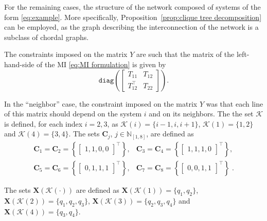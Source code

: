 \documentclass[10pt,twocolumn,twoside]{IEEEtran}
\theoremstyle{plain}
\theoremstyle{definition}
\theoremstyle{remark}
\begin{document}
For the remaining cases, the structure of the network composed of systems of the form \eqref{eq:example}. More specifically, Proposition~\ref{prop:clique tree decomposition} can be employed, as the graph describing the interconnection of the network is a subclass of chordal graphs. 

The constraints imposed on the matrix $Y$ are such that the matrix of the left-hand-side of the MI \eqref{eq:MI formulation} is given by
\begin{equation*}
	\mathbin{\mathtt{diag}}\left(\begin{bmatrix}
		T_{11}&T_{12}\\
		T_{12}^\top&T_{22}
	\end{bmatrix}\right).
\end{equation*}

In the ``neighbor'' case, the constraint imposed on the matrix $Y$ was that each line of this matrix should depend on the system $i$ and on its neighbors. The the set $\mathscr{K}$ is defined, for each index $i=2,3$, as $\mathscr{K}(i)=\{i-1,i,i+1\}$, $\mathscr{K}(1)=\{1,2\}$ and $\mathscr{K}(4)=\{3,4\}$. The sets $\mathbf{C}_j$, $j\in\mathbb{N}_{[1,8]}$, are defined as
\begin{equation*}
	\begin{array}{rl}
		\mathbf{C}_1=\mathbf{C}_2=\left\{\begin{bmatrix}1, 1, 0, 0\end{bmatrix}^\top\right\},&\mathbf{C}_3=\mathbf{C}_4=\left\{\begin{bmatrix}1, 1, 1, 0\end{bmatrix}^\top\right\},\\
		\mathbf{C}_5=\mathbf{C}_6=\left\{\begin{bmatrix}0, 1, 1, 1\end{bmatrix}^\top\right\},&		    \mathbf{C}_7=\mathbf{C}_8=\left\{\begin{bmatrix}0, 0, 1, 1\end{bmatrix}^\top\right\}\;.
	\end{array} 
\end{equation*}

The sets $\mathbf{X}(\mathscr{K}(\cdot))$ are defined as $\mathbf{X}(\mathscr{K}(1))=\{q_1,q_2\}$,  $\mathbf{X}(\mathscr{K}(2))=\{q_1,q_2,q_3\}$, $\mathbf{X}(\mathscr{K}(3))=\{q_2,q_3,q_4\}$ and $\mathbf{X}(\mathscr{K}(4))=\{q_3,q_4\}$.
\end{document}
